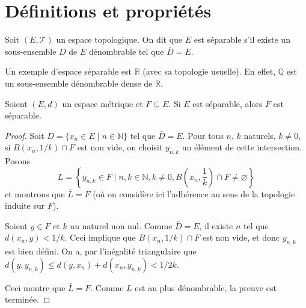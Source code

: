 \section{Définitions et propriétés}
\begin{df}
  Soit $(E, \mathcal T)$ un espace topologique. On dit que $E$ est séparable
  s'il existe un sous-ensemble $D$ de $E$ dénombrable tel que
  $\bar D = E$.
\end{df}

Un exemple d'espace séparable est $\mathbb R$ (avec sa topologie usuelle).
En effet, $\mathbb Q$ est un sous-ensemble dénombrable dense de $\mathbb R$.

\begin{prop}\label{sep:ind}
  Soient $(E, d)$ un espace métrique et $F\subseteq E$. Si $E$ est séparable,
  alors $F$ est séparable.
\end{prop}
\begin{proof}
  Soit $D = \{x_n \in E\mid {n\in\mathbb N}\}$ tel que $\bar D = E$.
  Pour tous $n$, $k$ naturels, $k\neq 0$, si
  $B\left(x_n, 1/k\right)\cap F$ est non
  vide, on choisit $y_{n, k}$ un élément de cette intersection. Posons
  $$L = \left\{y_{n, k} \in F\mid n, k\in\mathbb N, k \neq 0,
    B\left(x_n, \frac{1}{k}\right)\cap F\neq \varnothing\right\}$$
  et montrons que $\bar L = F$ (où on considère ici l'adhérence au sens
  de la topologie induite sur $F$).

  Soient $y\in F$ et $k$ un naturel non nul.
  Comme $\bar D = E$, il existe $n$ tel que $d(x_n, y) < 1/k$. Ceci implique
  que $B(x_n, 1/k)\cap F$ est non vide, et donc  $y_{n, k}$ est bien défini.
  On a, par l'inégalité triangulaire que $d(y, y_{n, k}) \leq d(y, x_n) +
  d(x_n, y_{n, k}) < 1/2k$.

  Ceci montre que $\bar L = F$. Comme $L$ est au plus dénombrable,
  la preuve est terminée.
\end{proof}

